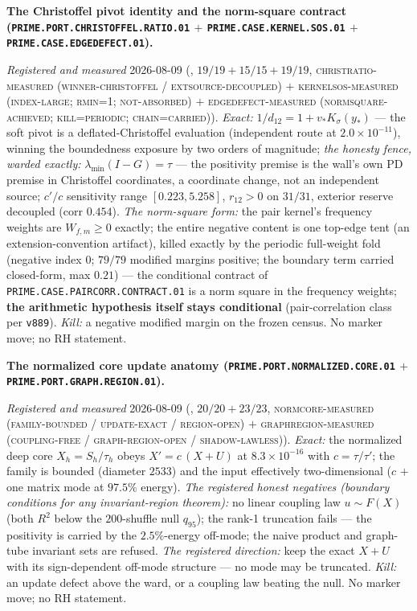 \documentclass[11pt,a4paper]{article}
\begin{document}
\par\smallskip\noindent\textbf{The Christoffel pivot identity
and the norm-square contract
(\texttt{PRIME.PORT.CHRISTOFFEL.\allowbreak RATIO.01} $+$
\texttt{PRIME.CASE.KERNEL.\allowbreak SOS.01} $+$
\texttt{PRIME.CASE.\allowbreak EDGEDEFECT.01}).}
{\sloppy
\emph{Registered and measured} 2026-08-09
(, $19/19 + 15/15 +
19/19$, \textsc{christratio-measured (winner-christoffel /
extsource-decoupled)} $+$ \textsc{kernelsos-measured
(index-large; rmin=1; not-absorbed)} $+$
\textsc{edgedefect-measured (normsquare-achieved;
kill=periodic; chain=carried)}).  \emph{Exact:} $1/d_{12} = 1 +
v_{*} K_\sigma(y_{*})$ --- the soft pivot is a
deflated-Christoffel evaluation (independent route at
$2.0\times10^{-11}$), winning the boundedness exposure by two
orders of magnitude; \emph{the honesty fence, warded exactly:}
$\lambda_{\min}(I - G) = \tau$ --- the positivity premise is
the wall's own PD premise in Christoffel coordinates, a
coordinate change, not an independent source; $c'/c$
sensitivity range $[0.223, 5.258]$, $r_{12} > 0$ on $31/31$,
exterior reserve decoupled (corr $0.454$).  \emph{The
norm-square form:} the pair kernel's frequency weights are
$W_{f,m} \ge 0$ exactly; the entire negative content is one
top-edge tent (an extension-convention artifact), killed
exactly by the periodic full-weight fold (negative index $0$;
$79/79$ modified margins positive; the boundary term carried
closed-form, max $0.21$) --- the conditional contract of
\texttt{PRIME.CASE.PAIRCORR.CONTRACT.01} is a norm square in
the frequency weights; \textbf{the arithmetic hypothesis itself
stays conditional} (pair-correlation class per \texttt{v889}).
\emph{Kill:} a negative modified margin on the frozen census.
No marker move; no RH statement.\par}

\par\smallskip\noindent\textbf{The normalized core update
anatomy (\texttt{PRIME.PORT.NORMALIZED.\allowbreak CORE.01} $+$
\texttt{PRIME.PORT.GRAPH.\allowbreak REGION.01}).}
{\sloppy
\emph{Registered and measured} 2026-08-09
(, $20/20 + 23/23$,
\textsc{normcore-measured (family-bounded / update-exact /
region-open)} $+$ \textsc{graphregion-measured (coupling-free /
graph-region-open / shadow-lawless)}).  \emph{Exact:} the
normalized deep core $X_h = S_h/\tau_h$ obeys $X' = c\,(X + U)$
at $8.3\times10^{-16}$ with $c = \tau/\tau'$; the family is
bounded (diameter $2533$) and the input effectively
two-dimensional ($c$ $+$ one matrix mode at $97.5\%$ energy).
\emph{The registered honest negatives (boundary conditions for
any invariant-region theorem):} no linear coupling law $u \sim
F(X)$ (both $R^{2}$ below the $200$-shuffle null $q_{95}$); the
rank-1 truncation fails --- the positivity is carried by the
$2.5\%$-energy off-mode; the naive product and graph-tube
invariant sets are refused.  \emph{The registered direction:}
keep the exact $X + U$ with its sign-dependent off-mode
structure --- no mode may be truncated.  \emph{Kill:} an update
defect above the ward, or a coupling law beating the null.  No
marker move; no RH statement.\par}
\end{document}
